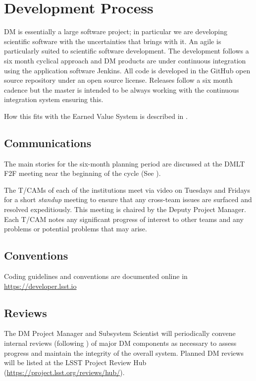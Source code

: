 \section{Development Process} \label{sect:devproc}

DM is essentially a large software project; in particular we are developing scientific software with the uncertainties that brings with it.
An agile \citep{it:agile} is particularly suited to scientific software development.  The development follows a six month  cyclical approach and  DM  products are under continuous
integration using the application software Jenkins. All code is developed in the GitHub open source repository under an open source license.
Releases follow a six month cadence but the master is intended to be always working with the continuous integration system ensuring this.

How this fits with the Earned Value System is described in .


\subsection{Communications}

The main stories for the six-month planning period are discussed at the DMLT F2F meeting near the beginning of the cycle (See ).

The T/CAMs of each of the institutions meet via video on Tuesdays and Fridays for a short \emph{standup} meeting to ensure that any cross-team issues are surfaced and resolved expeditiously.
This meeting is chaired by the Deputy Project Manager.
Each T/CAM notes any significant progress of interest to other teams and any problems or potential problems that may arise.

\subsection{Conventions}
Coding guidelines and conventions are documented online in \url{https://developer.lsst.io}

\subsection{Reviews} \label{sect:reviews}

The DM Project Manager and Subsystem Scientist will periodically convene internal reviews (following )
of major DM components as necessary to assess progress and maintain the integrity of the overall system. Planned DM reviews will be listed at the LSST Project Review Hub (\url{https://project.lsst.org/reviews/hub/}).

